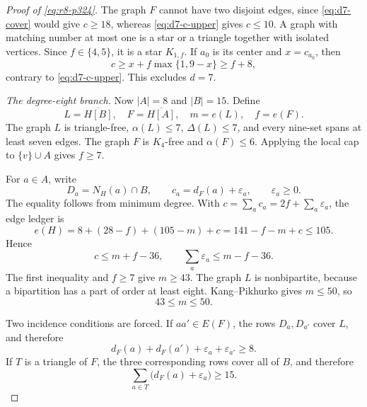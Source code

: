 \documentclass[11pt,reqno,a4paper]{amsart}
\theoremstyle{definition}
\theoremstyle{remark}
\newcommand{\comp}[1]{\overline{#1}}
\begin{document}
\begin{proof}[Proof of \eqref{eq:r8-p324}]
The graph $F$ cannot have two disjoint edges, since
\eqref{eq:d7-cover} would give $c\geq18$, whereas
\eqref{eq:d7-c-upper} gives $c\leq10$. A graph with matching number at
most one is a star or a triangle together with isolated vertices. Since
$f\in\{4,5\}$, it is a star $K_{1,f}$. If $a_0$ is its center and
$x=c_{a_0}$, then
\[
 c\geq x+f\max\{1,9-x\}\geq f+8,
\]
contrary to \eqref{eq:d7-c-upper}. This excludes $d=7$.

\medskip
\noindent\textit{The degree-eight branch.}
Now $|A|=8$ and $|B|=15$. Define
\[
 L=\comp{H[B]},\quad F=\comp{H[A]},
 \quad m=e(L),\quad f=e(F).
\]
The graph $L$ is triangle-free, $\alpha(L)\leq7$,
$\Delta(L)\leq7$, and every nine-set spans at least seven edges. The
graph $F$ is $K_4$-free and $\alpha(F)\leq6$. Applying the local cap
to $\{v\}\cup A$ gives $f\geq7$.

For $a\in A$, write
\[
 D_a=N_H(a)\cap B,
 \qquad c_a=d_F(a)+\varepsilon_a,
 \qquad \varepsilon_a\geq0.
\]
The equality follows from minimum degree. With
$c=\sum_ac_a=2f+\sum_a\varepsilon_a$, the edge ledger is
\[
 e(H)=8+(28-f)+(105-m)+c=141-f-m+c\leq105.
\]
Hence
\begin{equation}\label{eq:d8-slack}
 c\leq m+f-36,
 \qquad \sum_a\varepsilon_a\leq m-f-36.
\end{equation}
The first inequality and $f\geq7$ give $m\geq43$. The graph $L$ is
nonbipartite, because a bipartition has a part of order at least eight.
Kang--Pikhurko gives $m\leq50$, so
\begin{equation}\label{eq:d8-m-range}
 43\leq m\leq50.
\end{equation}

Two incidence conditions are forced. If $aa'\in E(F)$, the rows
$D_a,D_{a'}$ cover $L$, and therefore
\begin{equation}\label{eq:d8-pair-cover}
 d_F(a)+d_F(a')+\varepsilon_a+\varepsilon_{a'}\geq8.
\end{equation}
If $T$ is a triangle of $F$, the three corresponding rows cover all of
$B$, and therefore
\begin{equation}\label{eq:d8-triangle-cover}
 \sum_{a\in T}\bigl(d_F(a)+\varepsilon_a\bigr)\geq15.
\end{equation}


\end{proof}
\end{document}
